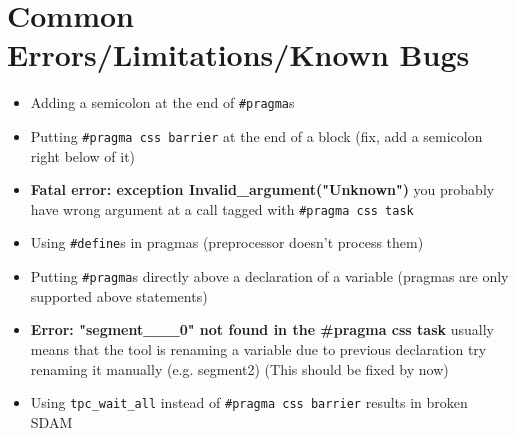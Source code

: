\documentclass[
a4paper,
12pt,
]{article}
\begin{document}
\section{Common Errors/Limitations/Known Bugs}

\begin{itemize}
\item Adding a semicolon at the end of \verb!#pragma!s
\item Putting \verb!#pragma css barrier! at the end of a block (fix,
  add a semicolon right below of it)
\item \textbf{{Fatal error: exception Invalid\_argument("Unknown")}}
  you probably have wrong argument at a call tagged with
  \verb!#pragma css task!
\item Using \verb!#define!s in pragmas (preprocessor doesn't process
  them)
\item Putting \verb!#pragma!s directly above a declaration of a
  variable (pragmas are only supported above statements)
\item \textbf{Error: "segment\_\_\_0" not found in the \#pragma css
    task} usually means that the tool is renaming a variable due to
  previous declaration try renaming it manually (e.g. segment2) (This
  should be fixed by now)
\item Using \verb!tpc_wait_all! instead of \verb!#pragma css barrier!
  results in broken SDAM
\end{itemize}
\end{document}
